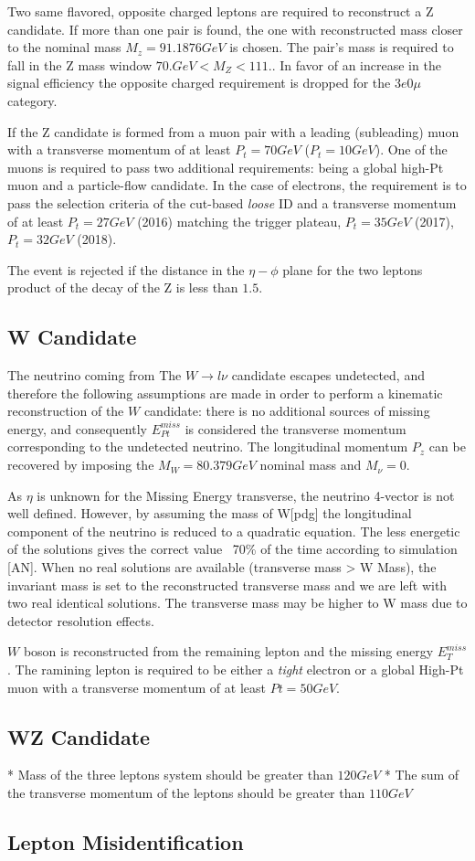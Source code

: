 Two same flavored, opposite charged leptons are required to reconstruct a Z
candidate. If more than one pair is found, the one with reconstructed mass
closer to the nominal mass $M_z= 91.1876 GeV$ is chosen. The pair's mass
is required to fall in the Z mass window $ 70. GeV < M_Z < 111.$. In favor of an
increase in the signal efficiency the opposite charged requirement is dropped
for the $3e0\mu$ category.

If the Z candidate is formed from a muon pair with a leading (subleading) muon with
a transverse momentum of at least $P_t=70 GeV$ ($P_t=10GeV$). One of the
muons is required to pass two additional requirements: being a global high-Pt muon and a
particle-flow candidate. In the case of electrons, the requirement is to pass the
selection criteria of the cut-based \emph{loose} ID and a transverse momentum of
at least $P_t=27GeV$ (2016) matching the trigger plateau, $P_t=35GeV$ (2017),
$P_t=32GeV$ (2018).

The event is rejected if the distance in the $\eta-\phi$ plane for the two
leptons product of the decay of the Z is less than $1.5$.

\subsection{W Candidate}

The neutrino coming from The $W \rightarrow l\nu$ candidate escapes undetected,
and therefore the following assumptions are made in order to perform a kinematic
reconstruction of the $W$ candidate: there is no additional sources of missing
energy, and consequently $E_{Pt}^{miss}$ is considered the transverse momentum
corresponding to the undetected neutrino. The longitudinal momentum $P_z$ can be
recovered by imposing the $M_W = 80.379 GeV $ nominal mass and $M_\nu = 0.$

As $\eta$ is unknown for the Missing Energy transverse, the neutrino 4-vector is
not well defined. However, by assuming the mass of W[pdg] the longitudinal component
of the neutrino is reduced to a quadratic equation. The less energetic of the
solutions gives the correct value ~70\% of the time according to simulation [AN].
When no real solutions are available (transverse mass > W Mass), the invariant
mass is set to the reconstructed transverse mass and we are left with two real
identical solutions. The transverse mass may be higher to W mass due to detector
resolution effects.

$W$ boson is reconstructed from the remaining lepton and the missing energy
$E_T^{miss}$. The ramining lepton is required to be either
a \emph{tight} electron or a global High-Pt muon with a transverse momentum
of at least $Pt=50GeV$.

\subsection{WZ Candidate}

* Mass of the three leptons system should be greater than $120GeV$
* The sum of the transverse momentum of the leptons should be greater than $110GeV$


\subsection{Lepton Misidentification}

